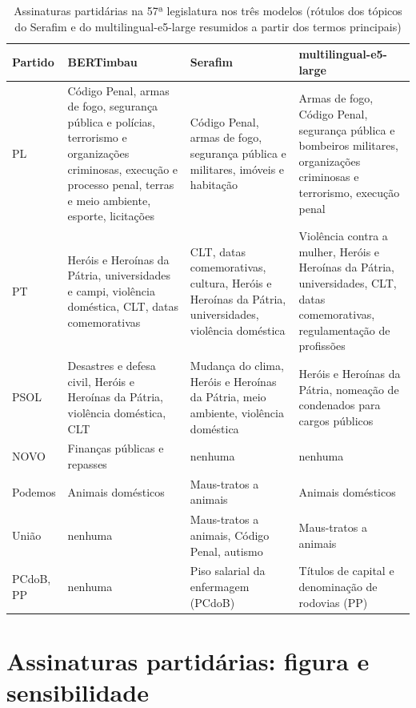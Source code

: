 \documentclass[12pt]{article}
\newcommand{\tabfont}{\fontsize{9}{11}\selectfont\setlength{\tabcolsep}{2.5pt}}
\begin{document}
\begin{table}[H]
\centering
\caption{Assinaturas partidárias na 57ª legislatura nos três modelos (rótulos dos tópicos do Serafim e do multilingual-e5-large resumidos a partir dos termos principais)}
\label{tab:rq2-modelos}
\tabfont
\begin{tabularx}{\textwidth}{>{\raggedright\arraybackslash}p{1.6cm} >{\raggedright\arraybackslash}X >{\raggedright\arraybackslash}X >{\raggedright\arraybackslash}X}
\toprule
\textbf{Partido} & \textbf{BERTimbau} & \textbf{Serafim} & \textbf{multilingual-e5-large} \\
\midrule
PL & Código Penal, armas de fogo, segurança pública e polícias, terrorismo e organizações criminosas, execução e processo penal, terras e meio ambiente, esporte, licitações & Código Penal, armas de fogo, segurança pública e militares, imóveis e habitação & Armas de fogo, Código Penal, segurança pública e bombeiros militares, organizações criminosas e terrorismo, execução penal \\
\midrule
PT & Heróis e Heroínas da Pátria, universidades e campi, violência doméstica, CLT, datas comemorativas & CLT, datas comemorativas, cultura, Heróis e Heroínas da Pátria, universidades, violência doméstica & Violência contra a mulher, Heróis e Heroínas da Pátria, universidades, CLT, datas comemorativas, regulamentação de profissões \\
\midrule
PSOL & Desastres e defesa civil, Heróis e Heroínas da Pátria, violência doméstica, CLT & Mudança do clima, Heróis e Heroínas da Pátria, meio ambiente, violência doméstica & Heróis e Heroínas da Pátria, nomeação de condenados para cargos públicos \\
\midrule
NOVO & Finanças públicas e repasses & nenhuma & nenhuma \\
\midrule
Podemos & Animais domésticos & Maus-tratos a animais & Animais domésticos \\
\midrule
União & nenhuma & Maus-tratos a animais, Código Penal, autismo & Maus-tratos a animais \\
\midrule
PCdoB, PP & nenhuma & Piso salarial da enfermagem (PCdoB) & Títulos de capital e denominação de rodovias (PP) \\
\bottomrule
\end{tabularx}
\end{table}

\clearpage
\section{Assinaturas partidárias: figura e sensibilidade}
\label{app:assinaturas}
\end{document}
